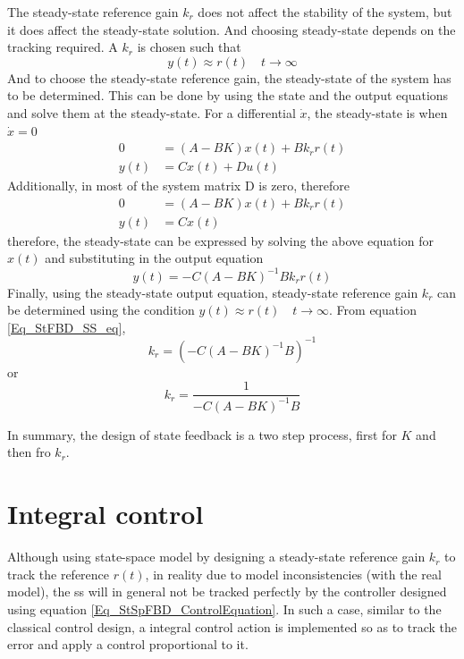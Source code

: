 The steady-state reference gain $k_r$ does not affect the stability of the system, but it does affect the steady-state solution. And choosing steady-state depends on the tracking required. A $k_r$ is chosen such that
$$	y(t) \approx r(t) \quad t \rightarrow \infty $$
And to choose the steady-state reference gain, the steady-state of the system has to be determined. This can be done by using the state and the output equations and solve them at the steady-state. For a differential $\dot{x}$, the steady-state is when $\dot{x} = 0$
\begin{align}
	0 &= (A - B K) x(t) + B k_r r(t) \\
	y(t) &= C x(t) + D u(t)
\end{align}
Additionally, in most of the system matrix D is zero, therefore
\begin{align}
0 &= (A - B K) x(t) + B k_r r(t) \\
y(t) &= C x(t) \label{Eq_StSp_FBD_Output}
\end{align}
therefore, the steady-state can be expressed by solving the above equation for $x(t)$ and substituting in the output equation
\begin{equation} \label{Eq_StFBD_SS_eq}
	y(t) = -C (A - B K)^{-1} B k_r r(t)
\end{equation}
Finally, using the steady-state output equation, steady-state reference gain $k_r$ can be determined using the condition $y(t) \approx r(t) \quad t \rightarrow \infty$. From equation \eqref{Eq_StFBD_SS_eq},
\begin{equation}
	k_r = (-C (A - B K)^{-1} B)^{-1}
\end{equation}
or
\begin{equation} \label{Eq_StSp_ss_ref_gain_eq}
	k_r = \frac{1}{-C (A - B K)^{-1} B}
\end{equation}

In summary, the design of state feedback is a two step process, first for $K$ and then fro $k_r$.

\section{Integral control}

Although using state-space model by designing a steady-state reference gain $k_r$ to track the reference $r(t)$, in reality due to model inconsistencies (with the real model), the ss will in general not be tracked perfectly by the controller designed using equation \eqref{Eq_StSpFBD_ControlEquation}. In such a case, similar to the classical control design, a integral control action is implemented so as to track the error and apply a control proportional to it. 

